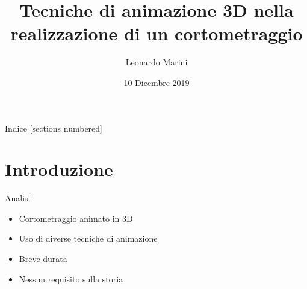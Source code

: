 \documentclass[10pt]{beamer}
\title{Tecniche di animazione 3D nella realizzazione di un cortometraggio}
\subtitle{}												%
\date{10 Dicembre 2019}
\author{Leonardo Marini}
\institute{ALMA MATER STUDIORUM - UNIVERSITÀ DI BOLOGNA}
\begin{document}
\maketitle

\begin{frame}{Indice}																		%
  [sections numbered] %
  \tableofcontents%
\end{frame}

\section[Intro]{Introduzione}

\begin{frame}{Analisi} 
      \begin{itemize}[<+- | alert@+>]								%
        \item Cortometraggio animato in 3D 					%
        \item Uso di diverse tecniche di animazione %
        \item Breve durata 													%
				\item Nessun requisito sulla storia 				%
      \end{itemize}
\end{frame}
\end{document}
